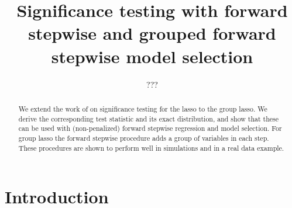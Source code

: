 \documentclass{imsart}
\begin{document}
\begin{frontmatter}

\title{Significance testing with forward stepwise and grouped forward
  stepwise model selection}


\author{ 
\and {} 
\and ???}


\address{Department of Statistics\\  Stanford University\\ Sequoia
Hall \\390 Serra Mall\\ Stanford, CA 94305, U.S.A.\\ }


\begin{abstract}
  We extend the work of \cite{significance:lasso} on significance
  testing for the lasso to the group lasso.  We derive the corresponding
  test statistic and its exact distribution, and show that these can be
  used with (non-penalized) forward stepwise regression and model
  selection.  For group lasso the forward stepwise procedure adds a
  group of variables in each step.  These procedures are shown to
  perform well in simulations and in a real data example.

\end{abstract}

\begin{keyword}[class=AMS]
\end{keyword}

\begin{keyword}
\end{keyword}

\end{frontmatter}


\section{Introduction}\label{sec:intro}
\end{document}

